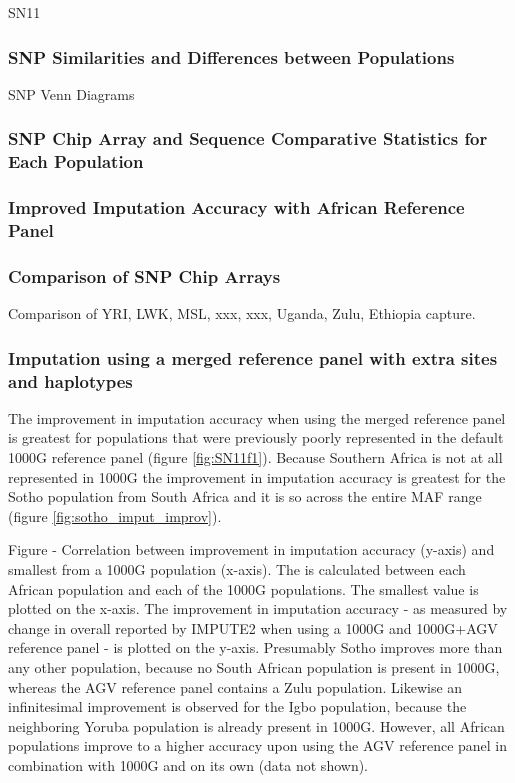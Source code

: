 SN11

\subsubsection{SNP Similarities and Differences between Populations}
SNP Venn Diagrams
\subsubsection{SNP Chip Array and Sequence Comparative Statistics for Each Population}
\subsubsection{Improved Imputation Accuracy with African Reference Panel}
\subsubsection{Comparison of SNP Chip Arrays}
Comparison of YRI, LWK, MSL, xxx, xxx, Uganda, Zulu, Ethiopia capture.

\subsubsection{Imputation using a merged reference panel with extra sites and haplotypes}

The improvement in imputation accuracy when using the merged reference panel is greatest for populations that were previously poorly represented in the default \gls{1000G} reference panel (figure \ref{fig:SN11f1}). Because Southern Africa is not at all represented in \gls{1000G} the improvement in imputation accuracy is greatest for the Sotho population from South Africa and it is so across the entire \gls{MAF} range (figure \ref{fig:sotho_imput_improv}).




Figure - Correlation between improvement in imputation accuracy (y-axis) and smallest  from a \gls{1000G} population (x-axis). The  is calculated between each African population and each of the \gls{1000G} populations. The smallest value is plotted on the x-axis. The improvement in imputation accuracy - as measured by change in overall  reported by IMPUTE2 when using a \gls{1000G} and \gls{1000G}+\gls{AGV} reference panel - is plotted on the y-axis. Presumably Sotho improves more than any other population, because no South African population is present in \gls{1000G}, whereas the \gls{AGV} reference panel contains a Zulu population. Likewise an infinitesimal improvement is observed for the Igbo population, because the neighboring Yoruba population is already present in \gls{1000G}. However, all African populations improve to a higher accuracy upon using the AGV reference panel in combination with \gls{1000G} and on its own (data not shown).

